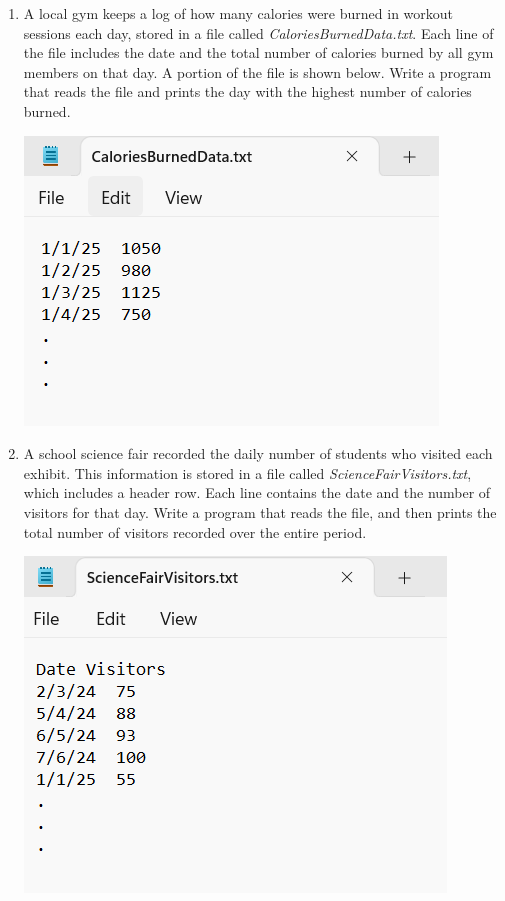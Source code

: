 \documentclass{article}
\begin{document}
\begin{enumerate}
	\item 
		A local gym keeps a log of how many calories were burned in workout sessions each day, stored in a file called \textit{CaloriesBurnedData.txt}.  
		Each line of the file includes the date and the total number of calories burned by all gym members on that day.  
		A portion of the file is shown below.  
		Write a program that reads the file and prints the day with the highest number of calories burned.
		
		\begin{flushright}
			\includegraphics[scale=.65]{imgs/CaloriesBurnedData.PNG}
		\end{flushright}


	\item 
		A school science fair recorded the daily number of students who visited each exhibit.  
		This information is stored in a file called \textit{ScienceFairVisitors.txt}, which includes a header row.  
		Each line contains the date and the number of visitors for that day.  
		Write a program that reads the file, and then prints the total number of visitors recorded over the entire period.
		
		\begin{flushright}
			\includegraphics[scale=.65]{imgs/ScienceFairVisitorsData.PNG}
		\end{flushright}



\end{enumerate}
\end{document}
